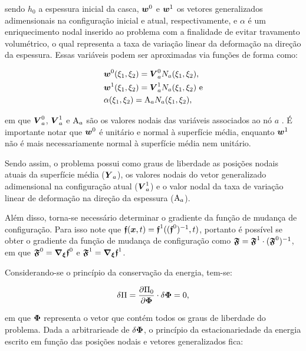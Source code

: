 \noindent sendo $h_0$ a espessura inicial da casca, $\boldsymbol{w}^0$ e $\boldsymbol{w}^1$ os vetores generalizados adimensionais na configuração inicial e atual, respectivamente, e $\alpha$ é um enriquecimento nodal inserido ao problema com a finalidade de evitar travamento volumétrico, o qual representa a taxa de variação linear da deformação na direção da espessura. Essas variáveis podem ser aproximadas via funções de forma como:

\begin{subequations}
    \begin{align}
         & \boldsymbol{w}^0(\xi_1,\xi_2)=\boldsymbol{V}^0_aN_a(\xi_1,\xi_2)\text{,}  \\
         & \boldsymbol{w}^1(\xi_1,\xi_2)=\boldsymbol{V}^1_aN_a(\xi_1,\xi_2)\text{ e} \\
         & \alpha(\xi_1,\xi_2)=\mathrm{A}_aN_a(\xi_1,\xi_2)\text{,}
    \end{align}
\end{subequations}

\noindent em que $\boldsymbol{V}^0_a$, $\boldsymbol{V}^1_a$ e $\mathrm{A}_a$ são os valores nodais das variáveis associados ao nó $a$ \cite{sanches2013unconstrained,sanches2014fluid}. É importante notar que $\boldsymbol{w}^0$ é unitário e normal à superfície média, enquanto $\boldsymbol{w}^1$ não é mais necessariamente normal à superfície média nem unitário.

Sendo assim, o problema possui como graus de liberdade as posições nodais atuais da superfície média ($\boldsymbol{Y}_a$), os valores nodais do vetor generalizado adimensional na configuração atual ($\boldsymbol{V}^1_a$) e o valor nodal da taxa de variação linear de deformação na direção da espessura ($\mathrm{A}_a$).

Além disso, torna-se necessário determinar o gradiente da função de mudança de configuração. Para isso note que $\boldsymbol{\mathfrak{f}}(\boldsymbol{x},t)=\boldsymbol{\mathfrak{f}}^1((\boldsymbol{\mathfrak{f}}^0)^{-1},t)$, portanto é possível se obter o gradiente da função de mudança de configuração como $\boldsymbol{\mathfrak{F}}=\boldsymbol{\mathfrak{F}}^1\cdot(\boldsymbol{\mathfrak{F}}^0)^{-1}$, em que $\boldsymbol{\mathfrak{F}}^0=\boldsymbol{\nabla_\xi}\boldsymbol{\mathfrak{f}}^0$ e $\boldsymbol{\mathfrak{F}}^1=\boldsymbol{\nabla_\xi}\boldsymbol{\mathfrak{f}}^1$.

Considerando-se o princípio da conservação da energia, tem-se:

\begin{equation}
    \delta\Pi=\frac{\partial{\Pi_0}}{\partial{\boldsymbol{\Phi}}}\cdot\delta\boldsymbol{\Phi}=0\text{,}
\end{equation}

\noindent em que $\boldsymbol{\Phi}$ representa o vetor que contém todos os graus de liberdade do problema. Dada a arbitrarieade de $\delta\boldsymbol{\Phi}$, o princípio da estacionariedade da energia escrito em função das posições nodais e vetores generalizados fica:

